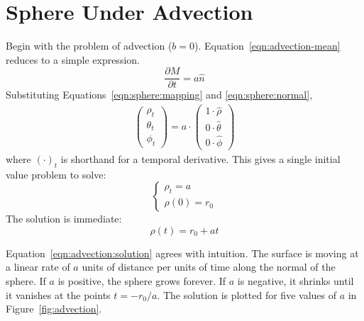 \documentclass[journal]{IEEEtran}
\begin{document}
\section{Sphere Under Advection}
\label{sec:advection}
Begin with the problem of advection ($b = 0$).
Equation~\ref{eqn:advection-mean} reduces to a simple expression.
\begin{equation}
  \frac{\partial M}{\partial t} = a \hat{n}
\end{equation}
Substituting Equations~\ref{eqn:sphere:mapping} and \ref{eqn:sphere:normal},
\begin{align}
  \begin{pmatrix}
    \rho_t \\
    \theta_t \\
    \phi_t
  \end{pmatrix} = a \cdot
  \begin{pmatrix}
    1 \cdot \hat{\rho} \\
    0 \cdot \hat{\theta} \\
    0 \cdot \hat{\phi}
  \end{pmatrix}
\end{align}
where $\left(\cdot\right)_t$ is shorthand for a temporal derivative.
This gives a single initial value problem to solve:
\begin{equation}
  \left\{
    \begin{array}{ll}
      \rho_t = a\\
      \rho(0) = r_0
    \end{array}
  \right.
\end{equation}
The solution is immediate:
\begin{equation}
  \label{eqn:advection:solution}
  \rho(t) = r_0 + at
\end{equation}

Equation~\ref{eqn:advection:solution} agrees with intuition.
The surface is moving at a linear rate of $a$ units of distance per units of time along the normal of the sphere.
If $a$ is positive, the sphere grows forever.
If $a$ is negative, it shrinks until it vanishes at the points $t = -r_0/a$.
The solution is plotted for five values of $a$ in Figure~\ref{fig:advection}.
\end{document}
